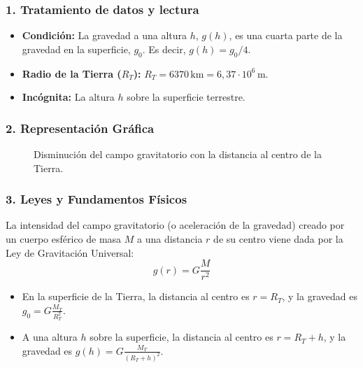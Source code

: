 \subsubsection*{1. Tratamiento de datos y lectura}
\begin{itemize}
    \item \textbf{Condición:} La gravedad a una altura $h$, $g(h)$, es una cuarta parte de la gravedad en la superficie, $g_0$. Es decir, $g(h) = g_0 / 4$.
    \item \textbf{Radio de la Tierra ($R_T$):} $R_T = 6370\,\text{km} = 6,37 \cdot 10^6\,\text{m}$.
    \item \textbf{Incógnita:} La altura $h$ sobre la superficie terrestre.
\end{itemize}

\subsubsection*{2. Representación Gráfica}
\begin{figure}[H]
    \centering
    \caption{Disminución del campo gravitatorio con la distancia al centro de la Tierra.}
\end{figure}

\subsubsection*{3. Leyes y Fundamentos Físicos}
La intensidad del campo gravitatorio (o aceleración de la gravedad) creado por un cuerpo esférico de masa $M$ a una distancia $r$ de su centro viene dada por la Ley de Gravitación Universal:
$$ g(r) = G \frac{M}{r^2} $$
\begin{itemize}
    \item En la superficie de la Tierra, la distancia al centro es $r = R_T$, y la gravedad es $g_0 = G \frac{M_T}{R_T^2}$.
    \item A una altura $h$ sobre la superficie, la distancia al centro es $r = R_T + h$, y la gravedad es $g(h) = G \frac{M_T}{(R_T + h)^2}$.
\end{itemize}


